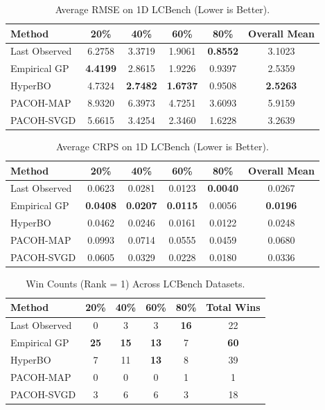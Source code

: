 \documentclass{article}
\begin{document}
\begin{table}[ht]
\centering
\small
\caption{Average RMSE on 1D LCBench (Lower is Better).}
\label{tab:app_rmse}
\begin{tabular}{lccccc}
\toprule
Method & 20\% & 40\% & 60\% & 80\% & Overall Mean \\
\midrule
Last Observed & 6.2758 & 3.3719 & 1.9061 & \textbf{0.8552} & 3.1023 \\
Empirical GP & \textbf{4.4199} & 2.8615 & 1.9226 & 0.9397 & 2.5359 \\
HyperBO & 4.7324 & \textbf{2.7482} & \textbf{1.6737} & 0.9508 & \textbf{2.5263} \\
PACOH-MAP & 8.9320 & 6.3973 & 4.7251 & 3.6093 & 5.9159 \\
PACOH-SVGD & 5.6615 & 3.4254 & 2.3460 & 1.6228 & 3.2639 \\
\bottomrule
\end{tabular}
\end{table}

\begin{table}[ht]
\centering
\small
\caption{Average CRPS on 1D LCBench (Lower is Better).}
\label{tab:app_crps}
\begin{tabular}{lccccc}
\toprule
Method & 20\% & 40\% & 60\% & 80\% & Overall Mean \\
\midrule
Last Observed & 0.0623 & 0.0281 & 0.0123 & \textbf{0.0040} & 0.0267 \\
Empirical GP & \textbf{0.0408} & \textbf{0.0207} & \textbf{0.0115} & 0.0056 & \textbf{0.0196} \\
HyperBO & 0.0462 & 0.0246 & 0.0161 & 0.0122 & 0.0248 \\
PACOH-MAP & 0.0993 & 0.0714 & 0.0555 & 0.0459 & 0.0680 \\
PACOH-SVGD & 0.0605 & 0.0329 & 0.0228 & 0.0180 & 0.0336 \\
\bottomrule
\end{tabular}
\end{table}

\begin{table}[ht]
\centering
\small
\caption{Win Counts (Rank = 1) Across LCBench Datasets.}
\label{tab:app_wins}
\begin{tabular}{lccccc}
\toprule
Method & 20\% & 40\% & 60\% & 80\% & Total Wins \\
\midrule
Last Observed & 0 & 3 & 3 & \textbf{16} & 22 \\
Empirical GP & \textbf{25} & \textbf{15} & \textbf{13} & 7 & \textbf{60} \\
HyperBO & 7 & 11 & \textbf{13} & 8 & 39 \\
PACOH-MAP & 0 & 0 & 0 & 1 & 1 \\
PACOH-SVGD & 3 & 6 & 6 & 3 & 18 \\
\bottomrule
\end{tabular}
\end{table}
\end{document}
